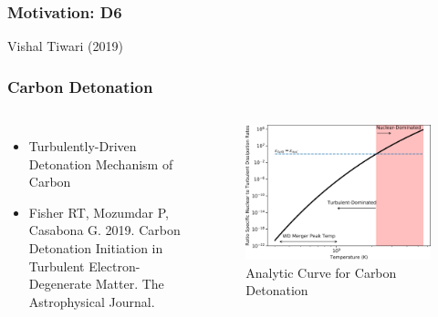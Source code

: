 \documentclass{beamer}
\begin{document}


\begin{frame}

        \frametitle{Motivation: D6}
        \begin{center}
                \end{center}
                \begin{center}
                        Vishal Tiwari (2019)
                \end{center}
\end{frame}




\begin{frame}
\frametitle{Carbon Detonation}

\begin{columns}[c]
        \begin{itemize}
                \item Turbulently-Driven Detonation Mechanism of Carbon
                \item Fisher RT, Mozumdar P, Casabona G. 2019. Carbon Detonation Initiation in Turbulent Electron-Degenerate Matter. The Astrophysical Journal.
        \end{itemize}


	\vspace{25pt}
        \begin{figure}
    \begin{center}
      \includegraphics[width=.90\linewidth]{carbon_enuc_ration.png}
            \caption{Analytic Curve for Carbon Detonation}
    \end{center}
  \end{figure}

        \end{columns}

\end{frame}
\end{document}
